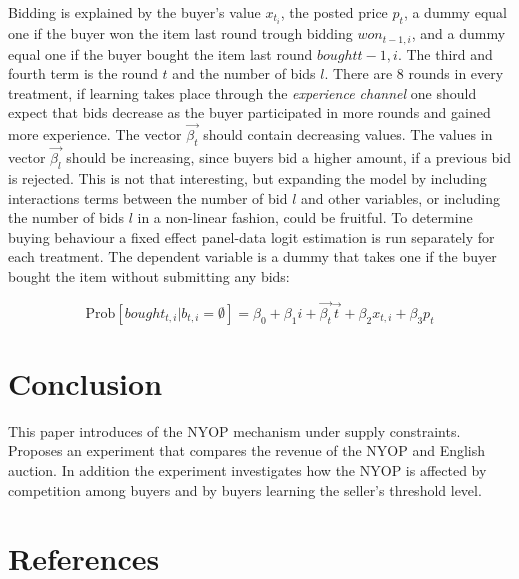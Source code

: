 \documentclass[a4paper,12pt]{article}
\begin{document}
	Bidding is explained by the buyer's value $x_{t_i}$, the posted price $p_t$, a dummy equal one if the buyer won the item last round trough bidding $won_{t-1,i}$, and a dummy equal one if the buyer bought the item last round $bought{t-1,i}$. The third and fourth term is the round $t$ and the number of bids $l$. There are 8 rounds in every treatment, if learning takes place through the \emph{experience channel} one should expect that bids decrease as the buyer participated in more rounds and gained more experience. The vector $\vec{\beta_t}$ should contain decreasing values. The values in vector $\vec{\beta_l}$ should be increasing, since buyers bid a higher amount, if a previous bid is rejected. This is not that interesting, but expanding the model by including interactions terms between the number of bid $l$ and other variables, or including the number of bids $l$ in a non-linear fashion, could be fruitful. To determine buying behaviour a fixed effect panel-data logit estimation is run separately for each treatment. The dependent variable is a dummy that takes one if the buyer bought the item without submitting any bids:

	\[ \mbox{Prob}[bought_{t,i} | b_{t,i} = \emptyset]  = \beta_0 + \beta_1 i + \vec{\beta_t} \vec{t} + \beta_2 x_{t,i} + \beta_3 p_t \]

	
	\section{Conclusion}
	This paper introduces of the NYOP mechanism under supply constraints. Proposes an experiment that compares the revenue of the NYOP and English auction. In addition the experiment investigates how the NYOP is affected by competition among buyers and by buyers learning the seller's threshold level.
		
	
			
	\newpage
	\appendix
	
	\begingroup
		\section{References}
		
		\nocite{*}
		\renewcommand{\section}[2]{}%
		\raggedright
		
	\endgroup
	
\end{document}
